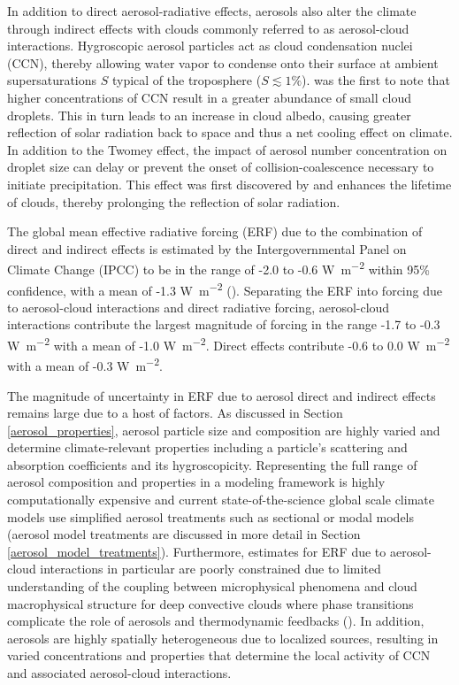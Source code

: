 In addition to direct aerosol-radiative effects, aerosols also alter the climate through indirect effects with clouds commonly referred to as aerosol-cloud interactions. Hygroscopic aerosol particles act as cloud condensation nuclei (CCN), thereby allowing water vapor to condense onto their surface at ambient supersaturations $S$ typical of the troposphere ($S\lesssim1\%$). \cite{twomey_influence_1977} was the first to note that higher concentrations of CCN result in a greater abundance of small cloud droplets. This in turn leads to an increase in cloud albedo, causing greater reflection of solar radiation back to space and thus a net cooling effect on climate. In addition to the Twomey effect, the impact of aerosol number concentration on droplet size can delay or prevent the onset of collision-coalescence necessary to initiate precipitation. This effect was first discovered by \cite{albrecht_aerosols_1989} and enhances the lifetime of clouds, thereby prolonging the reflection of solar radiation. 

The global mean effective radiative forcing (ERF) due to the combination of direct and indirect effects is estimated by the Intergovernmental Panel on Climate Change (IPCC) to be in the range of -2.0 to -0.6 \si{W.m^{-2}} within 95\% confidence, with a mean of -1.3 \si{W.m^{-2}} (\cite{ipcc_report_2021}). Separating the ERF into forcing due to aerosol-cloud interactions and direct radiative forcing, aerosol-cloud interactions contribute the largest magnitude of forcing in the range -1.7 to -0.3 \si{W.m^{-2}} with a mean of -1.0 \si{W.m^{-2}}. Direct effects contribute -0.6 to 0.0 \si{W.m^{-2}} with a mean of -0.3 \si{W.m^{-2}}. 

The magnitude of uncertainty in ERF due to aerosol direct and indirect effects remains large due to a host of factors. As discussed in Section \ref{aerosol_properties}, aerosol particle size and composition are highly varied and determine climate-relevant properties including a particle's scattering and absorption coefficients and its hygroscopicity. Representing the full range of aerosol composition and properties in a modeling framework is highly computationally expensive and current state-of-the-science global scale climate models use simplified aerosol treatments such as sectional or modal models (aerosol model treatments are discussed in more detail in Section \ref{aerosol_model_treatments}). Furthermore, estimates for ERF due to aerosol-cloud interactions in particular are poorly constrained due to limited understanding of the coupling between microphysical phenomena and cloud macrophysical structure for deep convective clouds where phase transitions complicate the role of aerosols and thermodynamic feedbacks (\cite{fan_review_2016}). In addition, aerosols are highly spatially heterogeneous due to localized sources, resulting in varied concentrations and properties that determine the local activity of CCN and associated aerosol-cloud interactions.

